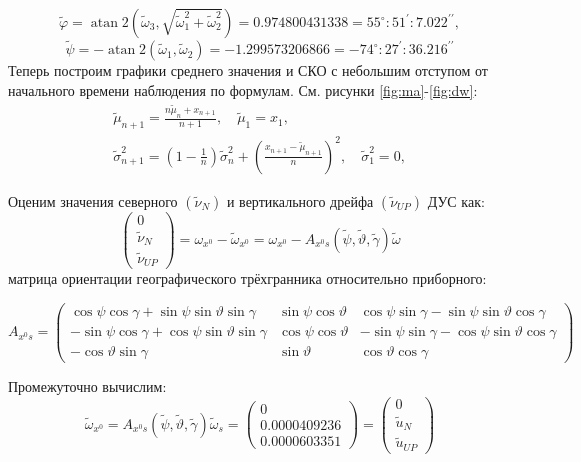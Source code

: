 \documentclass[a4paper,14pt]{article}
\theoremstyle{plain} %
\theoremstyle{definition} %
\theoremstyle{remark} %
\begin{document}
{$$
    \tilde{\varphi}=\operatorname{atan} 2\left(\widetilde{\omega}_{3}, \sqrt{\widetilde{\omega}_{1}^{2}+\widetilde{\omega}_{2}^{2}}\right)=0.974800431338=55^{\circ}: 51^{\prime}: 7.022^{\prime \prime},
$$
$$
    \widetilde{\psi}=-\operatorname{atan} 2\left(\widetilde{\omega}_{1}, \widetilde{\omega}_{2}\right)=-1.299573206866=-74^{\circ}: 27^{\prime}: 36.216^{\prime \prime}$$
Теперь построим графики среднего значения и СКО с небольшим отступом от начального времени наблюдения по формулам. См. рисунки \eqref{fig:ma}-\eqref{fig:dw}:
$$
    \begin{gathered}
        \widetilde{\mu}_{n+1}=\frac{n \widetilde{\mu}_{n}+x_{n+1}}{n+1}, \quad \widetilde{\mu}_{1}=x_{1}, \\
        \widetilde{\sigma}_{n+1}^{2}=\left(1-\frac{1}{n}\right) \widetilde{\sigma}_{n}^{2}+\left(\frac{x_{n+1}-\widetilde{\mu}_{n+1}}{n}\right)^{2}, \quad \widetilde{\sigma}_{1}^{2}=0,
    \end{gathered}
$$

Оценим значения северного $\left(\widetilde{\nu}_{N}\right)$ и вертикального дрейфа $\left(\widetilde{\nu}_{U P}\right)$ ДУС как:
$$
    \left(\begin{array}{c}
            0                   \\
            \widetilde{\nu}_{N} \\
            \widetilde{\nu}_{U P}
        \end{array}\right)=\omega_{x^{0}}-\widetilde{\omega}_{x^{0}}=\omega_{x^{0}}-A_{x^{0} s}(\widetilde{\psi}, \widetilde{\vartheta}, \widetilde{\gamma}) \widetilde{\omega}
$$
матрица ориентации географического трёхгранника относительно приборного:

$$
    A_{x^{0} s}=\left(\begin{array}{ccc}
            \cos \psi \cos \gamma+\sin \psi \sin \vartheta \sin \gamma  & \sin \psi \cos \vartheta & \cos \psi \sin \gamma-\sin \psi \sin \vartheta \cos \gamma  \\
            -\sin \psi \cos \gamma+\cos \psi \sin \vartheta \sin \gamma & \cos \psi \cos \vartheta & -\sin \psi \sin \gamma-\cos \psi \sin \vartheta \cos \gamma \\
            -\cos \vartheta \sin \gamma                                 & \sin \vartheta           & \cos \vartheta \cos \gamma
        \end{array}\right)
$$

Промежуточно вычислим:
$$
    \widetilde{\omega}_{x^{0}}=A_{x^{0} s}(\widetilde{\psi}, \widetilde{\vartheta}, \widetilde{\gamma}) \widetilde{\omega}_{s}=\left(\begin{array}{c}
            0            \\
            0.0000409236 \\
            0.0000603351
        \end{array}\right)=\left(\begin{array}{c}
            0             \\
            \tilde{u}_{N} \\
            \widetilde{u}_{U P}
        \end{array}\right)
$$

}
\end{document}
